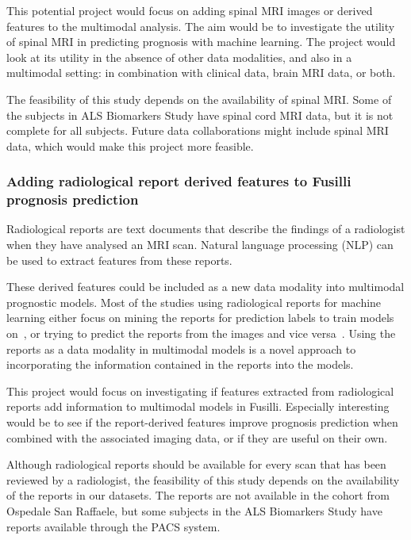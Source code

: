 This potential project would focus on adding spinal MRI images or derived features to the multimodal analysis.
The aim would be to investigate the utility of spinal MRI in predicting prognosis with machine learning.
The project would look at its utility in the absence of other data modalities, and also in a multimodal setting: in combination with clinical data, brain MRI data, or both.

The feasibility of this study depends on the availability of spinal MRI.
Some of the subjects in ALS Biomarkers Study have spinal cord MRI data, but it is not complete for all subjects.
Future data collaborations might include spinal MRI data, which would make this project more feasible.

\subsubsection{Adding radiological report derived features to Fusilli prognosis prediction}

Radiological reports are text documents that describe the findings of a radiologist when they have analysed an MRI scan.
Natural language processing (NLP) can be used to extract features from these reports.

These derived features could be included as a new data modality into multimodal prognostic models.
Most of the studies using radiological reports for machine learning either focus on mining the reports for prediction labels to train models on~\cite{nowakDevelopmentImagebasedDecision2023}, or trying to predict the reports from the images and vice versa~\cite{panChestRadiologyReport2024, gajbhiyeTranslatingMedicalImage2022}.
Using the reports as a data modality in multimodal models is a novel approach to incorporating the information contained in the reports into the models.

This project would focus on investigating if features extracted from radiological reports add information to multimodal models in Fusilli.
Especially interesting would be to see if the report-derived features improve prognosis prediction when combined with the associated imaging data, or if they are useful on their own.

Although radiological reports should be available for every scan that has been reviewed by a radiologist, the feasibility of this study depends on the availability of the reports in our datasets.
The reports are not available in the cohort from Ospedale San Raffaele, but some subjects in the ALS Biomarkers Study have reports available through the PACS system.

